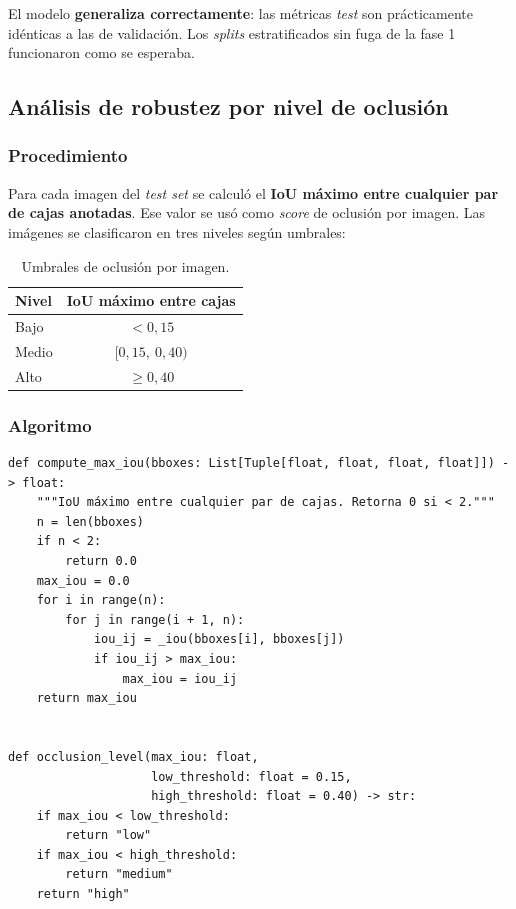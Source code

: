 \documentclass[journal,onecolumn,11pt]{IEEEtran}
\begin{document}
El modelo \textbf{generaliza correctamente}: las métricas \textit{test}
son prácticamente idénticas a las de validación. Los \textit{splits}
estratificados sin fuga de la fase 1 funcionaron como se esperaba.

\subsection{Análisis de robustez por nivel de oclusión}
\label{sec:oclusion}

\subsubsection{Procedimiento}

Para cada imagen del \textit{test set} se calculó el \textbf{IoU
máximo entre cualquier par de cajas anotadas}. Ese valor se usó como
\textit{score} de oclusión por imagen. Las imágenes se clasificaron
en tres niveles según umbrales:

\begin{table}[H]
\centering
\caption{Umbrales de oclusión por imagen.}
\begin{tabular}{l c}
\toprule
\textbf{Nivel} & \textbf{IoU máximo entre cajas} \\
\midrule
Bajo & $<0{,}15$ \\
Medio & $[0{,}15,\ 0{,}40)$ \\
Alto & $\geq 0{,}40$ \\
\bottomrule
\end{tabular}
\end{table}

\subsubsection{Algoritmo}

\begin{lstlisting}[caption={Cálculo de IoU máximo por imagen
(\texttt{src/analysis/occlusion.py}).}]
def compute_max_iou(bboxes: List[Tuple[float, float, float, float]]) -> float:
    """IoU máximo entre cualquier par de cajas. Retorna 0 si < 2."""
    n = len(bboxes)
    if n < 2:
        return 0.0
    max_iou = 0.0
    for i in range(n):
        for j in range(i + 1, n):
            iou_ij = _iou(bboxes[i], bboxes[j])
            if iou_ij > max_iou:
                max_iou = iou_ij
    return max_iou


def occlusion_level(max_iou: float,
                    low_threshold: float = 0.15,
                    high_threshold: float = 0.40) -> str:
    if max_iou < low_threshold:
        return "low"
    if max_iou < high_threshold:
        return "medium"
    return "high"
\end{lstlisting}
\end{document}

